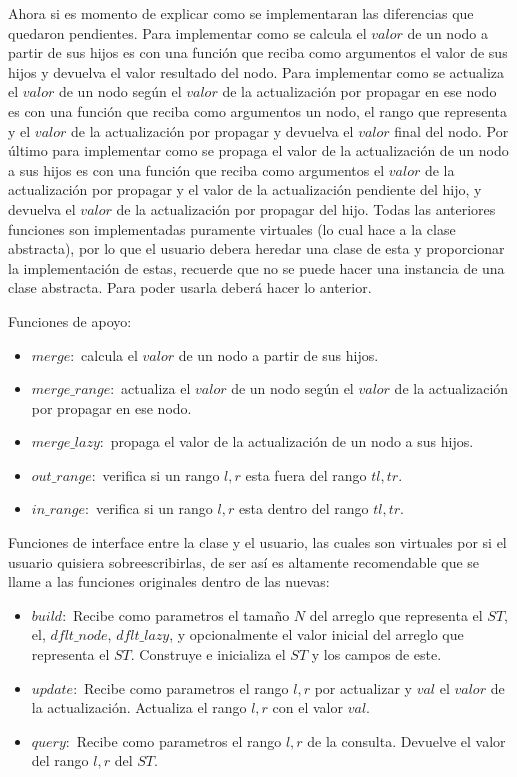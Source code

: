 \documentclass[letterpaper]{article}
\theoremstyle{definition}
\theoremstyle{lemathm}
\theoremstyle{lemathm}
\theoremstyle{lemathm}
\theoremstyle{lemademthm}
\newcommand{\1}{\mathbbm{1}}
\begin{document}
	Ahora si es momento de explicar como se implementaran las diferencias que quedaron pendientes. Para implementar como se calcula el $valor$ de un nodo a partir de sus hijos es con una función que reciba como argumentos el valor de sus hijos y devuelva el valor resultado del nodo. Para implementar como se actualiza el $valor$ de un nodo según el $valor$ de la actualización por propagar en ese nodo es con una función que reciba como argumentos un nodo, el rango que representa y el $valor$ de la actualización por propagar y devuelva el $valor$ final del nodo. Por último para implementar como se propaga el valor de la actualización de un nodo a sus hijos es con una función que reciba como argumentos el $valor$ de la actualización por propagar y el valor de la actualización pendiente del hijo, y devuelva el $valor$ de la actualización por propagar del hijo. Todas las anteriores funciones son implementadas puramente virtuales (lo cual hace a la clase abstracta), por lo que el usuario debera heredar una clase de esta y proporcionar la implementación de estas, recuerde que no se puede hacer una instancia de una clase abstracta. Para poder usarla deberá hacer lo anterior.

	Funciones de apoyo:

	\begin{itemize}
		\item $merge:$ calcula el $valor$ de un nodo a partir de sus hijos.
		\item $merge\_range:$ actualiza el $valor$ de un nodo según el $valor$ de la actualización por propagar en ese nodo.
		\item $merge\_lazy:$ propaga el valor de la actualización de un nodo a sus hijos.
		\item $out\_range:$ verifica si un rango $l,r$ esta fuera del rango $tl,tr$.
		\item $in\_range:$ verifica si un rango $l,r$ esta dentro del rango $tl,tr$.
	\end{itemize}

	Funciones de interface entre la clase y el usuario, las cuales son virtuales por si el usuario quisiera sobreescribirlas, de ser así es altamente recomendable que se llame a las funciones originales dentro de las nuevas:

	\begin{itemize}
		\item $build:$ Recibe como parametros el tamaño $N$ del arreglo que representa el $ST$, el, $dflt\_node$, $dflt\_lazy$, y opcionalmente el valor inicial del arreglo que representa el $ST$. Construye e inicializa el $ST$ y los campos de este.
		\item $update:$ Recibe como parametros el rango $l,r$ por actualizar y $val$ el $valor$ de la actualización. Actualiza el rango $l,r$ con el valor $val$.
		\item $query:$ Recibe como parametros el rango $l,r$ de la consulta. Devuelve el valor del rango $l,r$ del $ST$.
	\end{itemize}
\end{document}

